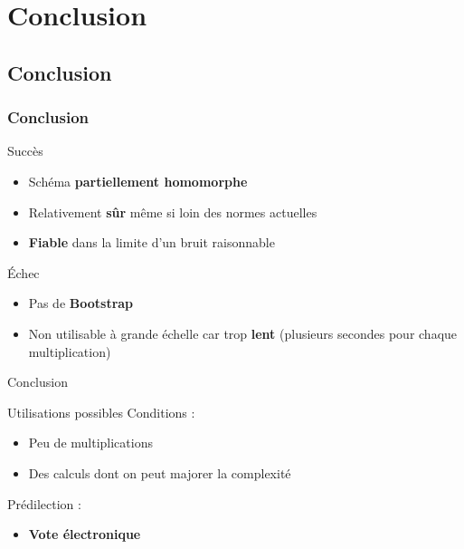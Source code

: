\section{Conclusion}
\subsection{Conclusion}
\begin{frame}
\frametitle{Conclusion}
\begin{alertblock}{Succès}
\begin{itemize}
    \item Schéma \textbf{partiellement homomorphe}
    \item Relativement \textbf{sûr} même si loin des normes actuelles
    \item \textbf{Fiable} dans la limite d'un bruit raisonnable
\end{itemize}{}
\end{alertblock}
\begin{alertblock}{Échec}
\begin{itemize}
    \item Pas de \textbf{Bootstrap}
    \item Non utilisable à grande échelle car trop \textbf{lent} (plusieurs secondes pour chaque multiplication)
\end{itemize}{}
\end{alertblock}{}

\end{frame}

\begin{frame}{Conclusion}
    \begin{alertblock}{Utilisations possibles}
    Conditions : 
    \begin{itemize}
        \item Peu de multiplications
        \item Des calculs dont on peut majorer la complexité
    \end{itemize}{}
    Prédilection :
    \begin{itemize}
        \item \textbf{Vote électronique}
    \end{itemize}{}
    \end{alertblock}
\end{frame}{}
